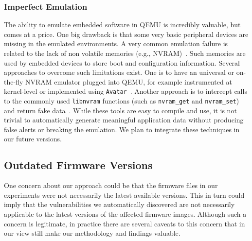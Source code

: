 \documentclass[conference]{./templates/ndss/IEEEtran}
\newcounter{t0d0_counter}
\newcounter{pr00f_counter}
\begin{document}
\subsubsection{Imperfect Emulation}
\label{sec:discuss-imperfectemu}

The ability to emulate embedded software in QEMU is incredibly
valuable, but comes at a price. One big drawback is that some
very basic peripheral devices are missing in the emulated
environments. 
A very common emulation failure is related to the lack of non
volatile memories (e.g., NVRAM)~\cite{devttyS0-nvram-emulate, shadowfile-nvram-emulate}. 
Such memories are used by
embedded devices to store boot and configuration information. 
Several approaches to overcome such limitations exist. One is to
have an universal or on-the-fly NVRAM emulator plugged into QEMU, 
for example instrumented at kernel-level or 
implemented using \texttt{Avatar}~\cite{zaddach:ndss14}.  Another
approach is to intercept calls to the commonly used \texttt{libnvram}
functions (such as \texttt{nvram\_get} and \texttt{nvram\_set}) and
return fake data~\cite{devttyS0-nvram-emulate, shadowfile-nvram-emulate}. 
While these tools are easy to compile and use, it is not trivial to 
automatically generate meaningful application data without producing 
false alerts or breaking the emulation.
We plan to integrate these techniques in our future versions. 




























\subsection{Outdated Firmware Versions}
\label{sec:discus-outdated}

One concern about our approach could be that the firmware files in 
our experiments were not necessarily the latest available versions. 
This in turn could imply that the vulnerabilities we automatically 
discovered are not necessarily applicable to the latest versions 
of the affected firmware images. Although such a concern is legitimate, 
in practice there are several caveats to this concern that in our 
view still make our methodology and findings valuable. 
\end{document}

